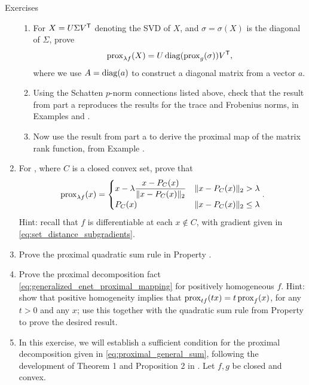 \begin{xcb}{Exercises}
\begin{enumerate}[label=\thechapter.\arabic*]
\begin{enumerate}[label=\alph*.]
\item For $X = U \Sigma V^{\mathsf{T}}$ denoting the SVD of $X$, and $\sigma = \sigma(X)$
  is the diagonal of $\Sigma$, prove   
  \[
  \operatorname{prox}_{\lambda f}(X) = U \operatorname{diag}(\operatorname{prox}_g(\sigma)) V^{\mathsf{T}},
  \]
  where we use $A = \operatorname{diag}(a)$ to construct a diagonal matrix from a vector $a$.    

\item Using the Schatten $p$-norm connections listed above, check that the
  result from part a reproduces the results for the trace and Frobenius norms, in
  Examples  and 
  .  
  
\item Now use the result from part a to derive the proximal map of the matrix
  rank function, from Example . 
\end{enumerate}

\item For ,
  where $C$ is a closed convex set, prove that   
  \[
  \operatorname{prox}_{\lambda f}(x) = 
  \begin{cases}
  \displaystyle
  x - \lambda \frac{x - P_C(x)}{\|x - P_C(x)\|_2} & 
  \|x - P_C(x)\|_2 > \lambda \\ 
  P_C(x) & \|x - P_C(x)\|_2 \leq \lambda \\ 
  \end{cases}.
  \]
  Hint: recall that $f$ is differentiable at each $x \notin C$, with gradient
  given in \eqref{eq:set_distance_subgradients}.    

\item Prove the proximal quadratic sum rule in Property
  .  

\item \label{ex:generalized_enet_proximal_mapping}
  Prove the proximal decomposition fact 
  \eqref{eq:generalized_enet_proximal_mapping} for positively homogeneous 
  $f$. Hint: show that positive homogeneity implies that $\operatorname{prox}_{tf}(tx) = t
  \operatorname{prox}_f(x)$, for any $t > 0$ and any $x$; use this together with the quadratic
  sum rule from Property  to prove the
  desired result.  

\item \label{ex:proximal_general_sum}
  In this exercise, we will establish a sufficient condition for the
  proximal decomposition given in \eqref{eq:proximal_general_sum}, following the
  development of Theorem 1 and Proposition 2 in \cite{yu2013decomposing}. Let  
  $f,g$ be closed and convex.   


\end{enumerate}
\end{xcb}
